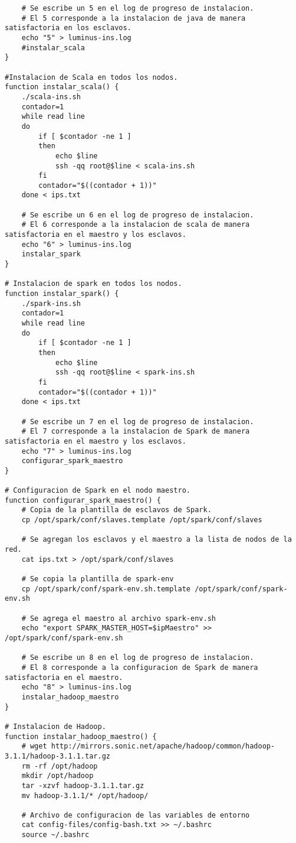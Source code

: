 \begin{lstlisting}
	# Se escribe un 5 en el log de progreso de instalacion.
	# El 5 corresponde a la instalacion de java de manera satisfactoria en los esclavos.
	echo "5" > luminus-ins.log
	#instalar_scala
}

#Instalacion de Scala en todos los nodos.
function instalar_scala() {
	./scala-ins.sh
	contador=1
	while read line
	do
		if [ $contador -ne 1 ]
		then
			echo $line
			ssh -qq root@$line < scala-ins.sh
		fi
		contador="$((contador + 1))"
	done < ips.txt

	# Se escribe un 6 en el log de progreso de instalacion.
	# El 6 corresponde a la instalacion de scala de manera satisfactoria en el maestro y los esclavos.
	echo "6" > luminus-ins.log
	instalar_spark
}

# Instalacion de spark en todos los nodos.
function instalar_spark() {
	./spark-ins.sh
	contador=1
	while read line
	do
		if [ $contador -ne 1 ]
		then
			echo $line
			ssh -qq root@$line < spark-ins.sh
		fi
		contador="$((contador + 1))"
	done < ips.txt

	# Se escribe un 7 en el log de progreso de instalacion.
	# El 7 corresponde a la instalacion de Spark de manera satisfactoria en el maestro y los esclavos.
	echo "7" > luminus-ins.log
	configurar_spark_maestro
}

# Configuracion de Spark en el nodo maestro.
function configurar_spark_maestro() {
	# Copia de la plantilla de esclavos de Spark.
	cp /opt/spark/conf/slaves.template /opt/spark/conf/slaves

	# Se agregan los esclavos y el maestro a la lista de nodos de la red.
	cat ips.txt > /opt/spark/conf/slaves 

	# Se copia la plantilla de spark-env
	cp /opt/spark/conf/spark-env.sh.template /opt/spark/conf/spark-env.sh

	# Se agrega el maestro al archivo spark-env.sh
	echo "export SPARK_MASTER_HOST=$ipMaestro" >> /opt/spark/conf/spark-env.sh
	
	# Se escribe un 8 en el log de progreso de instalacion.
	# El 8 corresponde a la configuracion de Spark de manera satisfactoria en el maestro.
	echo "8" > luminus-ins.log
	instalar_hadoop_maestro
}

# Instalacion de Hadoop.
function instalar_hadoop_maestro() {
	# wget http://mirrors.sonic.net/apache/hadoop/common/hadoop-3.1.1/hadoop-3.1.1.tar.gz
	rm -rf /opt/hadoop
	mkdir /opt/hadoop
	tar -xzvf hadoop-3.1.1.tar.gz
	mv hadoop-3.1.1/* /opt/hadoop/

	# Archivo de configuracion de las variables de entorno
	cat config-files/config-bash.txt >> ~/.bashrc
	source ~/.bashrc


\end{lstlisting}
